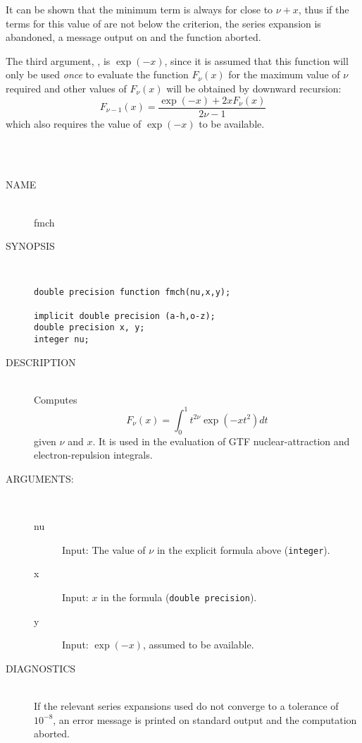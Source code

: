 It can be shown that the minimum term is always for
 close to $\nu + x$, thus if the terms for
this value of  are not below the criterion,
the series expansion is abandoned, a message output
on 
and the function aborted.

The third argument, , is $\exp(-x)$, since it
is assumed that this
function will only be used {\it once} to evaluate the function
$F_\nu (x) $ for the maximum value
of $\nu$ required and other values of
$F_\nu (x)$ will be obtained by downward recursion:
\[
F_{\nu-1}(x) = \frac{\exp(-x) + 2 x F_\nu (x) }{2 \nu -1 }
\]
which also requires the value of $\exp(-x)$ to be available.
%
\  \\ \ \\
\begin{minipage}{4.3in}
\ \\
\begin{description}
\item[NAME]  \      \\
fmch

\item[SYNOPSIS] \ \\
\begin{verbatim}
double precision function fmch(nu,x,y);

implicit double precision (a-h,o-z);
double precision x, y;
integer nu;

\end{verbatim}
\item[DESCRIPTION] \ \\
Computes
\[
 F_\nu (x)  = \int_0^1 t^{2 \nu} \exp (-x t^2) dt
\]
given $\nu$ and $x$. It is used in the evaluation of GTF
nuclear-attraction and electron-repulsion integrals.
\item[ARGUMENTS:] \  \\
\begin{description}
\item[nu] Input: The value of $\nu$ in the explicit
formula above ({\tt integer}).

\item[x] Input: $x$ in the formula ({\tt double precision}).

\item[y] Input: $\exp(-x)$, assumed to be available.

\end{description}

\item[DIAGNOSTICS] \  \\
If the relevant series expansions used do not converge
to a tolerance of $10^{-8}$, an error message is printed
on standard output and the computation aborted.
\end{description}
\ \\ \ \\
\end{minipage}
\ \\ \ \\

